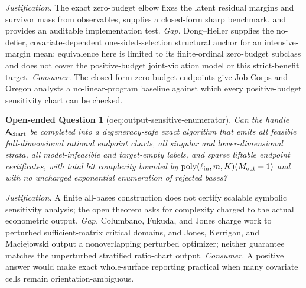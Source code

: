 \documentclass{article}
\newtheorem{openendedquestion}{Open-ended Question}
\begin{document}
\par\smallskip\noindent \textit{Justification.} The exact zero-budget elbow fixes the latent residual margins and survivor mass from observables, supplies a closed-form sharp benchmark, and provides an auditable implementation test. \textit{Gap.} Dong--Heiler supplies the no-defier, covariate-dependent one-sided-selection structural anchor for an intensive-margin mean; equivalence here is limited to its finite-ordinal zero-budget subclass and does not cover the positive-budget joint-violation model or this strict-benefit target. \textit{Consumer.} The closed-form zero-budget endpoints give Job Corps and Oregon analysts a no-linear-program baseline against which every positive-budget sensitivity chart can be checked.

\begin{openendedquestion}[oeq:output-sensitive-enumerator]\label{oeq:output-sensitive-enumerator}
Can the handle \(\mathsf A_{\rm chart}\) be completed into a degeneracy-safe exact algorithm that emits all feasible full-dimensional rational endpoint charts, all singular and lower-dimensional strata, all model-infeasible and target-empty labels, and sparse liftable endpoint certificates, with total bit complexity bounded by \(\operatorname{poly}(\ell_{\rm in},m,K)(M_{\rm out}+1)\) and with no uncharged exponential enumeration of rejected bases?
\end{openendedquestion}
\par\smallskip\noindent \textit{Justification.} A finite all-bases construction does not certify scalable symbolic sensitivity analysis; the open theorem asks for complexity charged to the actual econometric output. \textit{Gap.} Columbano, Fukuda, and Jones charge work to perturbed sufficient-matrix critical domains, and Jones, Kerrigan, and Maciejowski output a nonoverlapping perturbed optimizer; neither guarantee matches the unperturbed stratified ratio-chart output. \textit{Consumer.} A positive answer would make exact whole-surface reporting practical when many covariate cells remain orientation-ambiguous.
\end{document}
